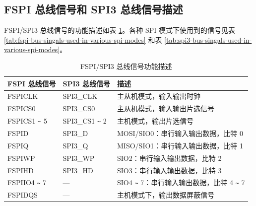 \documentclass[main\_\_CN.tex]{subfiles}
\begin{document}
\subsection{FSPI 总线信号和 SPI3 总线信号描述}

FSPI/SPI3 总线信号的功能描述如表  \ref{table:SPI_signals}。各种 SPI 模式下使用到的信号见表 \ref{tab:fspi-bus-singals-used-in-various-spi-modes} 和表 \ref{tab:spi3-bus-singals-used-in-various-spi-modes}。


\begin{ThreePartTable}

\begin{longtable}[c]{|l|l|l|}
\caption{FSPI/SPI3 总线信号功能描述}
\label{table:SPI_signals}\\
\hline
    \rowcolor{lightgray}
    \textbf{FSPI 总线信号}& \textbf{SPI3 总线信号}& \textbf{描述} \\
    \hline
    \endfirsthead

    \endlastfoot
    FSPICLK     & SPI3\_CLK     & 主从机模式，输入输出时钟 \\\hline
    FSPICS0     & SPI3\_CS0     &主从机模式，输入输出片选信号 \\\hline
    FSPICS1  \verb+~+ 5 & SPI3\_CS1 \verb+~+ 2  & 主机模式，输出片选信号\\\hline
    FSPID       & SPI3\_D       & MOSI/SIO0：串行输入输出数据，比特 0\\
    \hline
    FSPIQ       & SPI3\_Q       & MISO/SIO1：串行输入输出数据，比特 1 \\\hline
    FSPIWP      & SPI3\_WP      & SIO2：串行输入输出数据，比特 2 \\\hline
    FSPIHD      & SPI3\_HD      & SIO3：串行输入输出数据，比特 3 \\\hline
    FSPIIO4 \verb+~+ 7 &    ---   & SIO4 \verb+~+ 7：串行输入输出数据，比特 4 \verb+~+ 7 \\\hline
    FSPIDQS     & ---             & 主机模式下，输出数据屏蔽信号 \\\hline

\end{longtable}

\end{ThreePartTable}
\end{document}
